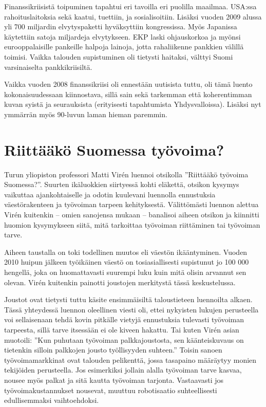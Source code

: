 \documentclass[12pt]{article}
\begin{document}
Finanssikriisistä toipuminen tapahtui eri tavoilla eri puolilla maailmaa. USA:ssa rahoituslaitoksia sekä kaatui, tuettiin, ja sosialisoitiin. Lisäksi vuoden 2009 alussa yli 700 miljardin elvytyspaketti hyväksyttiin kongressissa. Myös Japanissa käytettiin satoja miljardeja elvytykseen. EKP laski ohjauskorkoa ja myönsi eurooppalaisille pankeille halpoja lainoja, jotta rahaliikenne pankkien välillä toimisi. Vaikka talouden supistuminen oli tietysti haitaksi, välttyi Suomi varsinaiselta pankkikriisiltä.

Vaikka vuoden 2008 finanssikriisi oli ennestään uutisista tuttu, oli tämä luento kokonaisuudessaan kiinnostava, sillä sain sekä tarkemman että koherentimman kuvan syistä ja seurauksista (erityisesti tapahtumista Yhdysvalloissa). Lisäksi nyt ymmärrän myös 90-luvun laman hieman paremmin.


\newpage
\section{Riittääkö Suomessa työvoima?}

Turun yliopiston professori Matti Virén luennoi otsikolla ''Riittääkö työvoima Suomessa?''. Suurten ikäluokkien siirtyessä kohti eläkettä, otsikon kysymys vaikuttaa ajankohtaiselle ja odotin kuulevani luennolla ennustuksia väes\-tö\-ra\-ken\-teen ja työvoiman tarpeen kehityksestä. Välittömästi luennon alettua Virén kuitenkin -- omien sanojensa mukaan -- banalisoi aiheen otsikon ja kiinnitti huomion kysymykseen siitä, mitä tarkoittaa työvoiman riittäminen tai työvoiman tarve.

Aiheen taustalla on toki todellinen muutos eli väestön ikääntyminen. Vuoden 2010 huipun jälkeen työikäinen väestö on tosiasiallisesti supistunut jo 100 000 hengellä, joka on huomattavasti suurempi luku kuin mitä olisin arvannut sen olevan. Virén kuitenkin painotti joustojen merkitystä tässä keskustelussa.

Joustot ovat tietysti tuttu käsite ensimmäisiltä taloustieteen luennoilta alkaen. Tässä yhteydessä luennon oleellinen viesti oli, ettei nykyisten lukujen perusteella voi sellaisenaan tehdä kovin pitkälle vietyjä ennustuksia tulevasti työvoiman tarpeesta, sillä tarve itsessään ei ole kiveen hakattu. Tai kuten Virén asian muotoili: ''Kun puhutaan työvoiman palkkajoustosta, sen käänteiskuvaus on tietenkin silloin palkkojen jousto työllisyyden suhteen.'' Toisin sanoen työvoimamarkkinat ovat talouden pelikenttä, jossa tasapaino määräytyy monien tekijöiden perusteella. Jos esimerkiksi jollain alalla työvoiman tarve kasvaa, nousee myös palkat ja sitä kautta työvoiman tarjonta. Vastaavasti jos työvoimakustannukset nousevat, muuttuu robotisaatio suhteellisesti edullisemmaksi vaihtoehdoksi.
\end{document}
